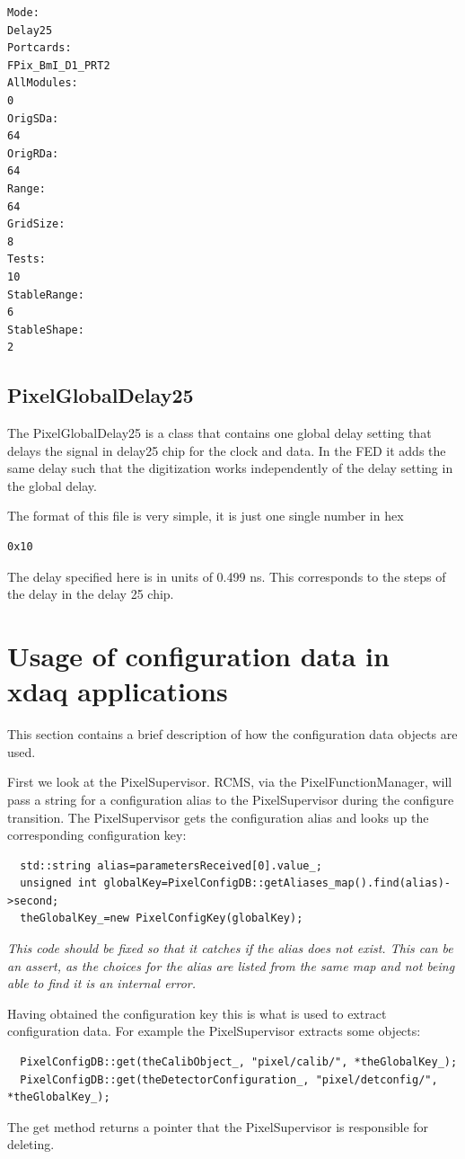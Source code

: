 \begin{verbatim}
Mode:
Delay25
Portcards:
FPix_BmI_D1_PRT2
AllModules:
0
OrigSDa:
64
OrigRDa:
64
Range:
64
GridSize:
8
Tests:
10
StableRange:
6
StableShape:
2
\end{verbatim}


\subsection{PixelGlobalDelay25}

The PixelGlobalDelay25 is a class that contains one global
delay setting that delays the signal in delay25 chip for the
clock and data. In the FED it adds the same delay such that
the digitization works independently of the delay setting
in the global delay.

The format of this file is very simple, it is just one single
number in hex
\begin{verbatim}
0x10
\end{verbatim}
The delay specified here is in units of 0.499 ns. This 
corresponds to the steps of the delay in the delay 25 chip.

\section{Usage of configuration data in xdaq applications}

This section contains a brief description of how the configuration data 
objects are used. 

First we look at the PixelSupervisor. RCMS, via the PixelFunctionManager,
will pass a string for a configuration alias to the PixelSupervisor
during the configure transition. The PixelSupervisor gets the configuration
alias and looks up the corresponding configuration key:
\begin{verbatim}
  std::string alias=parametersReceived[0].value_;
  unsigned int globalKey=PixelConfigDB::getAliases_map().find(alias)->second;
  theGlobalKey_=new PixelConfigKey(globalKey);
\end{verbatim}
{\it This code should be fixed so that it catches if the alias does
not exist. This can be an assert, as the choices for the alias are
listed from the same map and not being able to find it is an internal
error.}

Having obtained the configuration key this is what is used to extract
configuration data. For example the PixelSupervisor extracts some
objects:
\begin{verbatim}
  PixelConfigDB::get(theCalibObject_, "pixel/calib/", *theGlobalKey_);
  PixelConfigDB::get(theDetectorConfiguration_, "pixel/detconfig/", *theGlobalKey_);
\end{verbatim}
The get method returns a pointer that the PixelSupervisor is responsible
for deleting.

